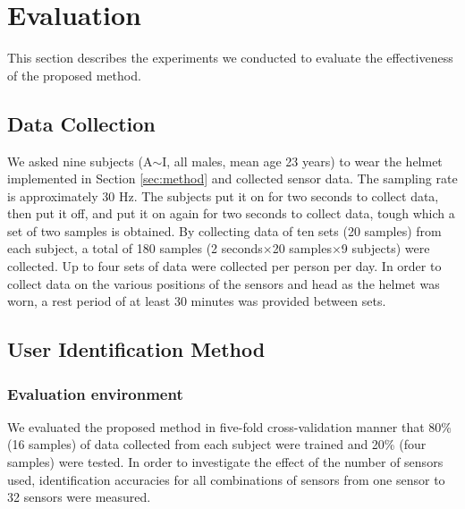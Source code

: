 \documentclass[sigchi,authordraft]{acmart}
\begin{document}
\section{Evaluation}
\label{sec:evaluation}
This section describes the experiments we conducted to evaluate the effectiveness of the proposed method.

\subsection{Data Collection}
We asked nine subjects (A$\sim$I, all males, mean age 23 years) to wear the helmet implemented in Section \ref{sec:method} and collected sensor data. The sampling rate is approximately 30 Hz. The subjects put it on for two seconds to collect data, then put it off, and put it on again for two seconds to collect data, tough which a set of two samples is obtained. By collecting data of ten sets (20 samples) from each subject, a total of 180 samples (2 seconds$\times$20 samples$\times$9 subjects) were collected. Up to four sets of data were collected per person per day. In order to collect data on the various positions of the sensors and head as the helmet was worn, a rest period of at least 30 minutes was provided between sets. 


\subsection{User Identification Method}
\subsubsection{Evaluation environment}
We evaluated the proposed method in five-fold cross-validation manner that 80\% (16 samples) of data collected from each subject were trained and 20\% (four samples) were tested. In order to investigate the effect of the number of sensors used, identification accuracies for all combinations of sensors from one sensor to 32 sensors were measured.\par
\end{document}
